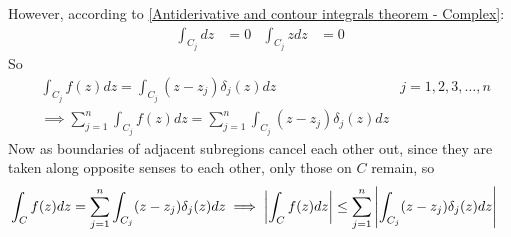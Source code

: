 \documentclass[12pt, english]{book}
\makeatletter
\renewenvironment{proof}[1][\proofname]{\par
	\pushQED{\qed}%
	\normalfont \topsep6\p@\@plus6\p@\relax
	\list{}{%
		\settowidth{\leftmargin}{\itshape\proofname:\hskip\labelsep}%
		\setlength{\labelwidth}{0pt}%
		\setlength{\itemindent}{-\leftmargin}%
		}%
	\item[\hskip\labelsep\itshape#1\@addpunct{:}]\ignorespaces
	}{\popQED\endlist\@endpefalse}
\makeatother
\begin{document}
\begin{proof}
		However, according to \cref{Antiderivative and contour integrals theorem - Complex}:
		\begin{align*}
			\int_{C_j} dz &= 0 & \int_{C_j} z dz &= 0
		\end{align*}
		So
		\begin{align*}
			&\int_{C_j} f(z) dz = \int_{C_j} (z - z_j) \delta_j(z) dz & j = 1, 2, 3, \ldots, n \\
			&\implies \sum_{j=1}^{n} \int_{C_j} f(z) dz  = \sum_{j=1}^{n} \int_{C_j} (z - z_j) \delta_j (z) dz
		\end{align*}
		Now as boundaries of adjacent subregions cancel each other out, since they are taken along opposite senses to each other, only those on \(C\) remain, so
		\begin{align*}
			&\int_{C} f(z) dz = \sum_{j=1}^{n} \int_{C_j} (z - z_j) \delta_j (z) dz  
			\implies \abs{\int_{C} f(z) dz} \leq \sum_{j=1}^{n} \abs{\int_{C_j} (z - z_j) \delta_j (z) dz}
		\end{align*}
	

\end{proof}
\end{document}
